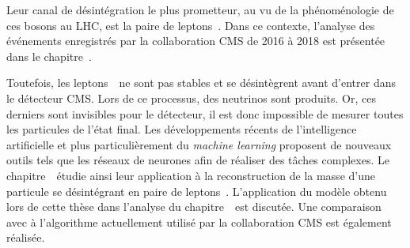 Leur canal de désintégration le plus prometteur,
au vu de la phénoménologie de ces bosons au LHC,
est la paire de leptons~\tau.
Dans ce contexte,
l'analyse des événements enregistrés par la collaboration CMS de 2016 à 2018
est présentée dans le chapitre~.
\par
Toutefois,
les leptons~\tau\ ne sont pas stables
et se désintègrent avant d'entrer dans le détecteur CMS.
Lors de ce processus,
des neutrinos sont produits.
Or, ces derniers sont invisibles pour le détecteur,
il est donc impossible de mesurer toutes les particules de l'état final.
Les développements récents de l'intelligence artificielle
et plus particulièrement du \emph{machine learning}
proposent de nouveaux outils tels que les réseaux de neurones
afin de réaliser des tâches complexes.
Le chapitre~\ étudie ainsi
leur application à
la reconstruction de la masse d'une particule se désintégrant en paire de leptons~\tau.
L'application du modèle obtenu lors de cette thèse
dans l'analyse du chapitre~\ est discutée.
Une comparaison avec
à l'algorithme actuellement utilisé par la collaboration CMS
est également réalisée.
